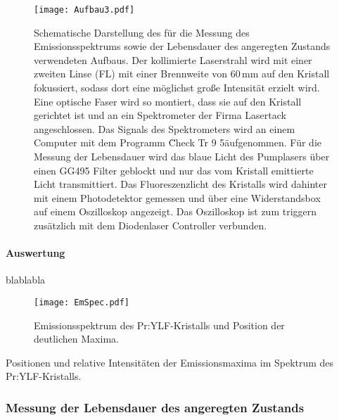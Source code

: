 \begin{figure}[H]
\begin{center}
  \texttt{[image: Aufbau3.pdf]}
  \caption{Schematische Darstellung des für die Messung des Emissionsspektrums sowie der Lebensdauer des angeregten Zustands verwendeten Aufbaus. Der kollimierte Laserstrahl wird mit einer zweiten Linse (FL) mit einer Brennweite von 60\,mm auf den Kristall fokussiert, sodass dort eine möglichst große Intensität erzielt wird. Eine optische Faser wird so montiert, dass sie auf den Kristall gerichtet ist und an ein Spektrometer der Firma Lasertack angeschlossen. Das Signals des Spektrometers wird an einem Computer mit dem Programm \"Check Tr 9 5\" aufgenommen. Für die Messung der Lebensdauer wird das blaue Licht des Pumplasers über einen GG495 Filter geblockt und nur das vom Kristall emittierte Licht transmittiert. Das Fluoreszenzlicht des Kristalls wird dahinter mit einem Photodetektor gemessen und über eine Widerstandsbox auf einem Oszilloskop angezeigt. Das Oszilloskop ist zum triggern zusätzlich mit dem Diodenlaser Controller verbunden.}
  \label{img:aufbau3}
\end{center}
\end{figure}




\paragraph{Auswertung}

blablabla

\begin{figure}[H]
\begin{center}
  \texttt{[image: EmSpec.pdf]}
  \caption{Emissionsspektrum des Pr:YLF-Kristalls und Position der deutlichen Maxima.}
  \label{img:EmSpec}
\end{center}
\end{figure}

\begin{table}[htb]
\caption{Positionen und relative Intensitäten der Emissionsmaxima im Spektrum des
Pr:YLF-Kristalls.}

\label{tab:EmSpec}
\end{table}


\FloatBarrier


\subsubsection{Messung der Lebensdauer des angeregten Zustands}

